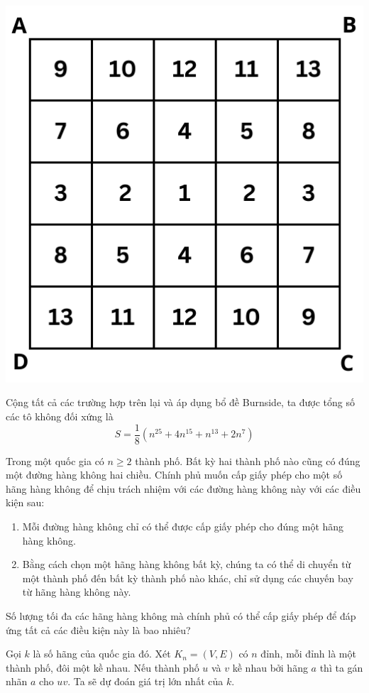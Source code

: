 \documentclass[11pt]{scrartcl}
\begin{document}
\begin{itemize}[label=, leftmargin=0em, itemsep=0.5em]
\begin{sol}
            \begin{center}
                \includegraphics[scale=0.57]{tam.pdf}
            \end{center}

            Cộng tất cả các trường hợp trên lại và áp dụng bổ đề Burnside, ta được tổng số các tô không đối xứng là 
            \[
            S = \frac{1}{8} \left(n^{25} + 4n^{15} + n^{13} + 2n^7\right)
            \]
        \end{sol}
    \begin{bt} Trong một quốc gia có $n\geq 2$ thành phố. Bất kỳ hai thành phố nào cũng có đúng một đường hàng không hai chiều. Chính phủ muốn cấp giấy phép cho một số hãng hàng không để chịu trách nhiệm với các đường hàng không này với các điều kiện sau:
        \begin{enumerate}
            \item Mỗi đường hàng không chỉ có thể được cấp giấy phép cho đúng một hãng hàng không.
            \item Bằng cách chọn một hãng hàng không bất kỳ, chúng ta có thể di chuyển từ một thành phố đến bất kỳ thành phố nào khác, chỉ sử dụng các chuyến bay từ hãng hàng không này.
        \end{enumerate}
        Số lượng tối đa các hãng hàng không mà chính phủ có thể cấp giấy phép để đáp ứng tất cả các điều kiện này là bao nhiêu?
    \end{bt}
    \begin{sol}
        Gọi $k$ là số hãng của quốc gia đó. Xét $K_n = (V,E)$ có $n$ đỉnh, mỗi đỉnh là một thành phố, đôi một kề nhau. Nếu thành phố $u$ và $v$ kề nhau bởi hãng $a$ thì ta gán nhãn $a$ cho $uv$. Ta sẽ dự đoán giá trị lớn nhất của $k$.



\end{sol}
\end{itemize}
\end{document}
